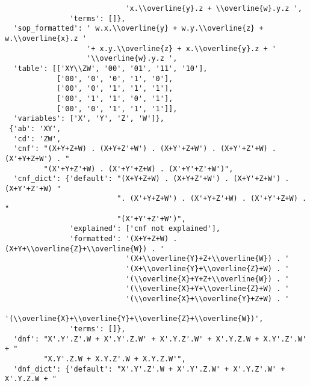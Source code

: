\begin{verbatim}
                            'x.\\overline{y}.z + \\overline{w}.y.z ',
               'terms': []},
  'sop_formatted': ' w.x.\\overline{y} + w.y.\\overline{z} + w.\\overline{x}.z '
                   '+ x.y.\\overline{z} + x.\\overline{y}.z + '
                   '\\overline{w}.y.z ',
  'table': [['XY\\ZW', '00', '01', '11', '10'],
            ['00', '0', '0', '1', '0'],
            ['00', '0', '1', '1', '1'],
            ['00', '1', '1', '0', '1'],
            ['00', '0', '1', '1', '1']],
  'variables': ['X', 'Y', 'Z', 'W']},
 {'ab': 'XY',
  'cd': 'ZW',
  'cnf': "(X+Y+Z+W) . (X+Y+Z'+W') . (X+Y'+Z+W') . (X+Y'+Z'+W) . (X'+Y+Z+W') . "
         "(X'+Y+Z'+W) . (X'+Y'+Z+W) . (X'+Y'+Z'+W')",
  'cnf_dict': {'default': "(X+Y+Z+W) . (X+Y+Z'+W') . (X+Y'+Z+W') . (X+Y'+Z'+W) "
                          ". (X'+Y+Z+W') . (X'+Y+Z'+W) . (X'+Y'+Z+W) . "
                          "(X'+Y'+Z'+W')",
               'explained': ['cnf not explained'],
               'formatted': '(X+Y+Z+W) . (X+Y+\\overline{Z}+\\overline{W}) . '
                            '(X+\\overline{Y}+Z+\\overline{W}) . '
                            '(X+\\overline{Y}+\\overline{Z}+W) . '
                            '(\\overline{X}+Y+Z+\\overline{W}) . '
                            '(\\overline{X}+Y+\\overline{Z}+W) . '
                            '(\\overline{X}+\\overline{Y}+Z+W) . '
                            '(\\overline{X}+\\overline{Y}+\\overline{Z}+\\overline{W})',
               'terms': []},
  'dnf': "X'.Y'.Z'.W + X'.Y'.Z.W' + X'.Y.Z'.W' + X'.Y.Z.W + X.Y'.Z'.W' + "
         "X.Y'.Z.W + X.Y.Z'.W + X.Y.Z.W'",
  'dnf_dict': {'default': "X'.Y'.Z'.W + X'.Y'.Z.W' + X'.Y.Z'.W' + X'.Y.Z.W + "

\end{verbatim}
